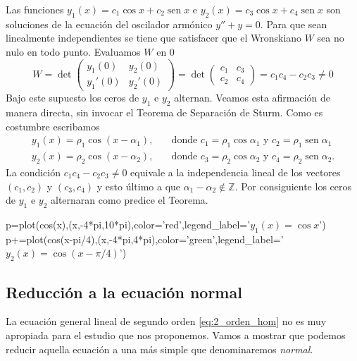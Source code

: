 \documentclass{article}
\DeclareMathOperator{\sen}{sen}
\begin{document}
\begin{ejemplo} Las funciones $y_1(x)=c_1\cos x+c_2\sen x$ e $y_2(x)=c_3\cos x+c_4\sen x$ son soluciones de la ecuación del oscilador armónico $y''+y=0$. Para que sean linealmente independientes se tiene que satisfacer que el Wronskiano $W$ sea no nulo en todo punto. Evaluamos $W$  en $0$ 
\[W=\det\begin{pmatrix} y_1(0) & y_2(0)\\y_1'(0) & y_2'(0) 
\end{pmatrix}=\det\begin{pmatrix} c_1 & c_3\\c_2 & c_4 
\end{pmatrix}=c_1c_4-c_2c_3\neq 0\]
Bajo este supuesto los ceros de $y_1$ e $y_2$ alternan. Veamos esta afirmación de manera directa, sin invocar el Teorema de Separación de Sturm. Como  es costumbre escribamos 
\[\begin{split}
y_1(x)=\rho_1\cos(x-\alpha_1),&\quad\text{donde } c_1=\rho_1\cos\alpha_1\text{ y }c_2=\rho_1\sen\alpha_1\\
y_2(x)=\rho_2\cos(x-\alpha_2),&\quad\text{donde }c_3=\rho_2\cos\alpha_2\text{ y }c_4=\rho_2\sen\alpha_2.
\end{split}
\]
La condición $c_1c_4-c_2c_3\neq 0$ equivale a la independencia lineal de los vectores $(c_1,c_2)$ y $(c_3,c_4)$ y esto último a que $\alpha_1-\alpha_2\notin\mathbb{Z}$. Por consiguiente los ceros de $y_1$ e $y_2$ alternaran como predice el Teorema. 

\begin{sageblock}
p=plot(cos(x),(x,-4*pi,10*pi),color='red',legend_label='$y_1(x)=\cos x$')
p+=plot(cos(x-pi/4),(x,-4*pi,4*pi),color='green',legend_label='$y_2(x)=\cos( x-\pi/4)$')
\end{sageblock}
\begin{center}
\end{center}

\end{ejemplo}

\subsection{Reducción a la ecuación normal}

La ecuación general lineal  de segundo orden  \eqref{eq:2_orden_hom} no es muy apropiada para el estudio que nos proponemos. Vamos a mostrar que podemos reducir aquella ecuación a una más simple que denominaremos \emph{normal}.
\end{document}
